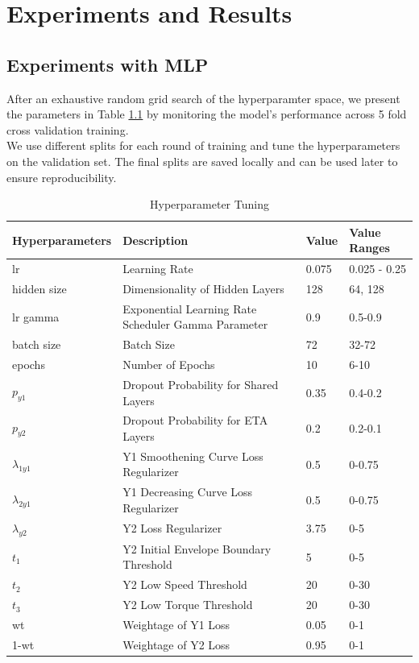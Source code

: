 \documentclass{report} %
\begin{document}
\newpage 
\newpage 

\chapter{Experiments and Results}

\section{Experiments with \ac{MLP}}\label{sec:Experiments with MLP}

After an exhaustive random grid search of the hyperparamter space, we present the parameters in Table \ref{tab:Hyperparameter Tunings} by monitoring the model's performance across 5 fold cross validation training.\\
We use different splits for each round of training and tune the hyperparameters on the validation set. The final splits are saved locally and can be used later to ensure reproducibility. 

\begin{table}[H]
    \centering
    \begin{tabularx}{\linewidth}{|p{}|p{}|p{}|p{}|}
    \hline {\bf Hyperparameters} & {\bf Description} & {\bf Value} & {\bf Value Ranges}\\
    \hline 
    lr & Learning Rate & 0.075 & 0.025 - 0.25\\
    hidden size & Dimensionality of Hidden Layers& 128 & 64, 128\\
    lr gamma & Exponential Learning Rate Scheduler Gamma Parameter & 0.9 & 0.5-0.9\\
    batch size & Batch Size & 72 & 32-72\\
    epochs & Number of Epochs & 10 & 6-10\\
    $p_{y1}$ & Dropout Probability for Shared Layers & 0.35 & 0.4-0.2\\
    $p_{y2}$ & Dropout Probability for ETA Layers & 0.2 & 0.2-0.1\\
    $\lambda_{1y1}$ & Y1 Smoothening Curve Loss Regularizer & 0.5 & 0-0.75\\
    $\lambda_{2y1}$ & Y1 Decreasing Curve Loss Regularizer & 0.5 & 0-0.75\\
    $\lambda_{y2}$ & Y2 Loss Regularizer & 3.75 & 0-5\\
    $t_{1}$ & Y2 Initial Envelope Boundary Threshold & 5 & 0-5\\
    $t_{2}$ & Y2 Low Speed Threshold & 20 & 0-30\\
    $t_{3}$ & Y2 Low Torque Threshold & 20 & 0-30\\
    wt & Weightage of Y1 Loss & 0.05 & 0-1\\
    1-wt & Weightage of Y2 Loss & 0.95 & 0-1\\
    \hline
    \end{tabularx}
    \caption{Hyperparameter Tuning}
    \label{tab:Hyperparameter Tunings}
\end{table}
\end{document}
